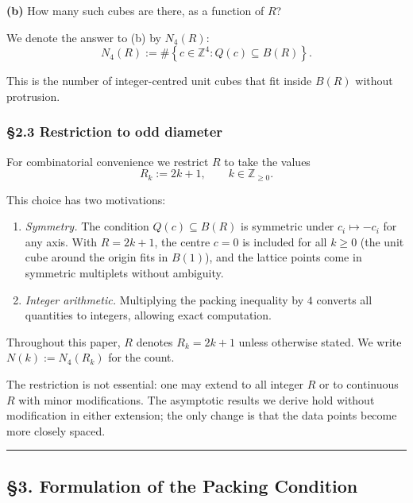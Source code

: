 \documentclass[a4paper,11pt]{article}
\theoremstyle{definition}
\begin{document}
\textbf{(b)} How many such cubes are there, as a function of \(R\)?

We denote the answer to (b) by \(N_4(R)\):
\[N_4(R) := \#\left\{c \in \mathbb{Z}^4 : Q(c) \subseteq B(R)\right\}.\]

This is the number of integer-centred unit cubes that fit inside
\(B(R)\) without protrusion.

\subsubsection{§2.3 Restriction to odd
diameter}\label{restriction-to-odd-diameter}

For combinatorial convenience we restrict \(R\) to take the values
\[R_k := 2k + 1, \qquad k \in \mathbb{Z}_{\ge 0}.\]

This choice has two motivations:

\begin{enumerate}
\def\labelenumi{\arabic{enumi}.}
\item
  \emph{Symmetry.} The condition \(Q(c) \subseteq B(R)\) is symmetric
  under \(c_i \mapsto -c_i\) for any axis. With \(R = 2k+1\), the centre
  \(c = 0\) is included for all \(k \ge 0\) (the unit cube around the
  origin fits in \(B(1)\)), and the lattice points come in symmetric
  multiplets without ambiguity.
\item
  \emph{Integer arithmetic.} Multiplying the packing inequality by \(4\)
  converts all quantities to integers, allowing exact computation.
\end{enumerate}

Throughout this paper, \(R\) denotes \(R_k = 2k + 1\) unless otherwise
stated. We write \(N(k) := N_4(R_k)\) for the count.

The restriction is not essential: one may extend to all integer \(R\) or
to continuous \(R\) with minor modifications. The asymptotic results we
derive hold without modification in either extension; the only change is
that the data points become more closely spaced.

\begin{center}\rule{0.5\linewidth}{0.5pt}\end{center}

\subsection{§3. Formulation of the Packing
Condition}\label{formulation-of-the-packing-condition}
\end{document}
